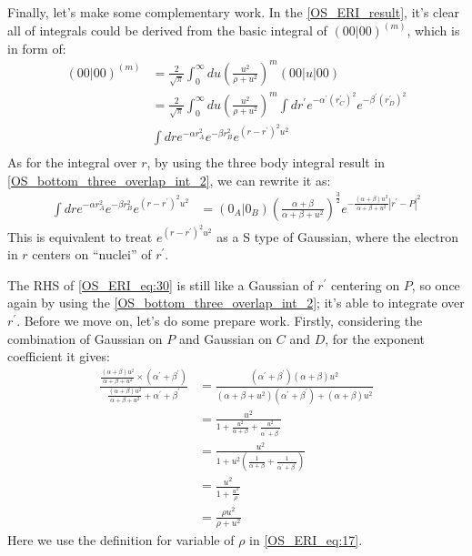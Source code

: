 Finally, let's make some complementary work. In the \ref{OS_ERI_result},
it's clear all of integrals could be derived from the basic integral of
$(00|00)^{(m)}$, which is in form of:
\begin{equation}
 \begin{split}
 (00|00)^{(m)} &= \frac{2}{\sqrt{\pi}} \int_{0}^{\infty} du \left( \frac{u^{2}}
{\rho+u^{2}}\right)^{m} (00|u|00) \\
&=\frac{2}{\sqrt{\pi}} \int_{0}^{\infty} du \left( \frac{u^{2}}
{\rho+u^{2}}\right)^{m} 
\int dr^{'}  e^{-\alpha^{'} (r^{'}_{C})^{2}}e^{-\beta^{'} (r^{'}_{D})^{2}} \\
&\int dr  e^{-\alpha r_{A}^{2}} e^{-\beta r_{B}^{2}} e^{(r-r^{'})^{2}u^{2}} \\
\end{split}
\end{equation}
As for the integral over $r$, by using the three body integral result in
\ref{OS_bottom_three_overlap_int_2}, we can rewrite it as:
\begin{equation}
 \begin{split}
  \int dr  e^{-\alpha r_{A}^{2}} e^{-\beta r_{B}^{2}} e^{(r-r^{'})^{2}u^{2}} &=
  (0_{A}|0_{B})\left( \frac{\alpha+\beta}{\alpha+\beta+u^{2}}\right)^{\frac{3}{2}}
e^{-\frac{(\alpha+\beta)u^{2}}{\alpha+\beta+u^{2}}|r^{'}-P|^{2}} 
 \end{split}
 \label{OS_ERI_eq:30}
\end{equation}
This is equivalent to treat $e^{(r-r^{'})^{2}u^{2}}$ as a S type of Gaussian, where
the electron in $r$ centers on ``nuclei'' of $r^{'}$.

The RHS of \ref{OS_ERI_eq:30} is still like a Gaussian of $r^{'}$ centering
on $P$, so once again by using the \ref{OS_bottom_three_overlap_int_2};
it's able to integrate over $r^{'}$. Before we move on, let's do some prepare
work. Firstly, considering the combination of Gaussian on $P$ and Gaussian
on $C$ and $D$, for the exponent coefficient it gives:
\begin{equation}
 \begin{split}
  \frac{\frac{(\alpha+\beta)u^{2}}{\alpha+\beta+u^{2}}\times
  (\alpha^{'}+\beta^{'})}{\frac{(\alpha+\beta)u^{2}}{\alpha+\beta+u^{2}} 
  +\alpha^{'}+\beta^{'}} 
  &= \frac{(\alpha^{'}+\beta^{'})(\alpha+\beta)u^{2}}
  {(\alpha+\beta+u^{2})(\alpha^{'}+\beta^{'})+(\alpha+\beta)u^{2}} \\
  &= \frac{u^{2}}{1+\frac{u^{2}}{\alpha+\beta}+\frac{u^{2}}{\alpha^{'}+\beta^{'}}} \\
  &= \frac{u^{2}}{1+u^{2}\left( \frac{1}{\alpha+\beta}+\frac{1}{\alpha^{'}+\beta^{'}}
  \right) } \\
  &= \frac{u^{2}}{1+\frac{u^{2}}{\rho}} \\
  &= \frac{\rho u^{2}}{\rho+ u^{2}}
 \end{split}
 \label{OS_ERI_eq:31}
 \end{equation}
 Here we use the definition for variable of $\rho$ in \ref{OS_ERI_eq:17}.
 
